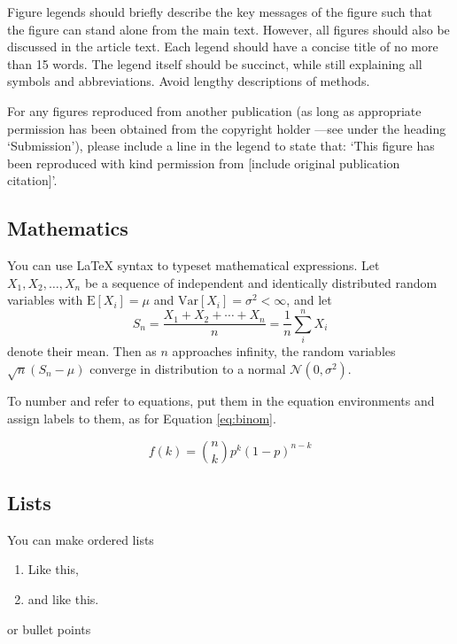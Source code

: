 \documentclass[9pt,a4paper,]{extarticle}
\theoremstyle{definition}
\theoremstyle{definition}
\theoremstyle{definition}
\theoremstyle{remark}
\begin{document}
Figure legends should briefly describe the key messages of the figure
such that the figure can stand alone from the main text. However, all
figures should also be discussed in the article text. Each legend should
have a concise title of no more than 15 words. The legend itself should
be succinct, while still explaining all symbols and abbreviations. Avoid
lengthy descriptions of methods.

For any figures reproduced from another publication (as long as
appropriate permission has been obtained from the copyright holder
---see under the heading `Submission'), please include a line in the
legend to state that: `This figure has been reproduced with kind
permission from {[}include original publication citation{]}'.

\subsection{Mathematics}\label{mathematics}

You can use LaTeX syntax to typeset mathematical expressions. Let
\(X_1, X_2, \ldots, X_n\) be a sequence of independent and identically
distributed random variables with \(\text{E}[X_i] = \mu\) and
\(\text{Var}[X_i] = \sigma^2 < \infty\), and let
\[S_n = \frac{X_1 + X_2 + \cdots + X_n}{n}
      = \frac{1}{n}\sum_{i}^{n} X_i\] denote their mean. Then as \(n\)
approaches infinity, the random variables \(\sqrt{n}(S_n - \mu)\)
converge in distribution to a normal \(\mathcal{N}(0, \sigma^2)\).

To number and refer to equations, put them in the equation environments
and assign labels to them, as for Equation \eqref{eq:binom}.

\begin{equation}
  f\left(k\right) = \binom{n}{k} p^k\left(1-p\right)^{n-k}
  \label{eq:binom}
\end{equation}

\subsection{Lists}\label{lists}

You can make ordered lists

\begin{enumerate}
\def\labelenumi{\arabic{enumi}.}
\item
  Like this,
\item
  and like this.
\end{enumerate}

or bullet points
\end{document}
